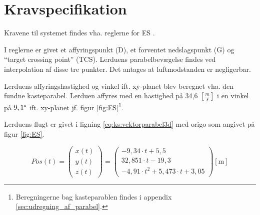 \section{Kravspecifikation}
\label{sec:kravspecifikation}
Kravene til systemet findes vha. reglerne for ES \citep{ES_regler}.


I reglerne er givet et affyringspunkt (D), et forventet nedslagspunkt (G) og ``target crossing point'' (TCS).
Lerduens parabelbevægelse findes ved interpolation af disse tre punkter. Det antages at luftmodstanden er negligerbar.

%
Lerduens affyringshastighed og vinkel ift. xy-planet blev beregnet vha. den fundne kasteparabel. 
Lerduen affyres med en hastighed på 34,6 \([\frac{m}{s}]\) i en vinkel på \(9,1\degree\) 
ift. xy-planet jf. figur \ref{fig:ES}\footnote{Beregningerne bag kasteparablen findes i appendix \ref{sec:udregning_af_parabel}.}. 

Lerduens flugt er givet i ligning \ref{eq:ks:vektorparabel3d} med origo som angivet på figur \ref{fig:ES}. 

\begin{equation}
Pos\left( t \right) = 
\left( \begin{matrix} 
	x\left( t \right)  \\ 
	y\left( t \right)  \\ 
	z\left( t \right)  \end{matrix} \right) =
	 \left( \begin{matrix} 
	- 9,34\cdot t+5,5 \\
  32,851\cdot t-19,3 \\ 
 -{ 4,91\cdot t }^{ 2 }+5,473\cdot t+3,05\end{matrix} \right) [\text{m}]
\label{eq:ks:vektorparabel3d}
\end{equation}

